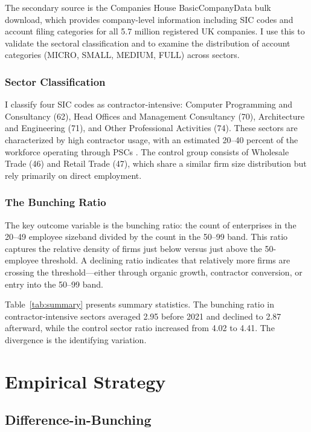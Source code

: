 \documentclass[12pt]{article}
\begin{document}
The secondary source is the Companies House BasicCompanyData bulk download, which provides company-level information including SIC codes and account filing categories for all 5.7 million registered UK companies. I use this to validate the sectoral classification and to examine the distribution of account categories (MICRO, SMALL, MEDIUM, FULL) across sectors.

\subsubsection*{Sector Classification} I classify four SIC codes as contractor-intensive: Computer Programming and Consultancy (62), Head Offices and Management Consultancy (70), Architecture and Engineering (71), and Other Professional Activities (74). These sectors are characterized by high contractor usage, with an estimated 20--40 percent of the workforce operating through PSCs \citep{adams2020offpayroll}. The control group consists of Wholesale Trade (46) and Retail Trade (47), which share a similar firm size distribution but rely primarily on direct employment.

\subsubsection*{The Bunching Ratio} The key outcome variable is the bunching ratio: the count of enterprises in the 20--49 employee sizeband divided by the count in the 50--99 band. This ratio captures the relative density of firms just below versus just above the 50-employee threshold. A declining ratio indicates that relatively more firms are crossing the threshold---either through organic growth, contractor conversion, or entry into the 50--99 band.



Table~\ref{tab:summary} presents summary statistics. The bunching ratio in contractor-intensive sectors averaged 2.95 before 2021 and declined to 2.87 afterward, while the control sector ratio increased from 4.02 to 4.41. The divergence is the identifying variation.


\section{Empirical Strategy}

\subsection{Difference-in-Bunching}
\end{document}
